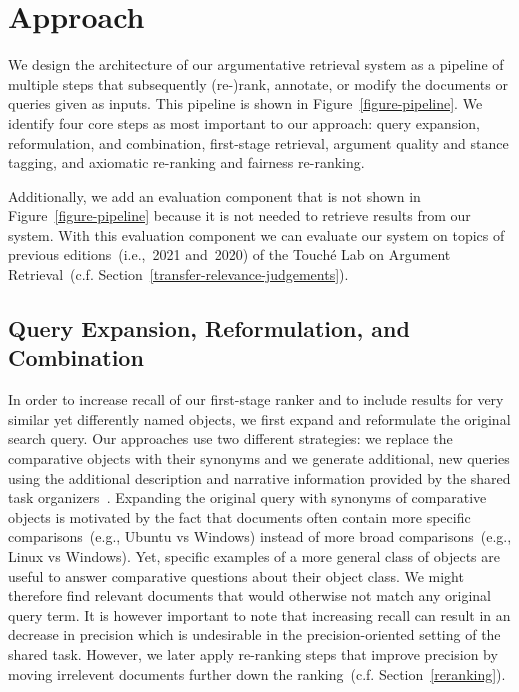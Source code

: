 \section{Approach}\label{approach}



We design the architecture of our argumentative retrieval system as a pipeline of multiple steps that subsequently (re-)rank, annotate, or modify the documents or queries given as inputs. This pipeline is shown in Figure~\ref{figure-pipeline}.
We identify four core steps as most important to our approach:
\Ni query expansion, reformulation, and combination,
\Nii first-stage retrieval,
\Niii argument quality and stance tagging,
and \Niv axiomatic re-ranking and fairness re-ranking.

Additionally, we add an evaluation component that is not shown in Figure~\ref{figure-pipeline} because it is not needed to retrieve results from our system.
With this evaluation component we can evaluate our system on topics of previous editions~(i.e.,~2021 and~2020) of the Touché Lab on Argument Retrieval~(c.f. Section~\ref{transfer-relevance-judgements}).

\subsection{Query Expansion, Reformulation, and Combination}
\label{reformulation}

In order to increase recall of our first-stage ranker and to include results for very similar yet differently named objects, we first expand and reformulate the original search query.
Our approaches use two different strategies: \Ni we replace the comparative objects with their synonyms and \Nii we generate additional, new queries using the additional description and narrative information provided by the shared task organizers~\cite{BondarenkoFKSGBPBSWPH2022}.
Expanding the original query with synonyms of comparative objects is motivated by the fact that documents often contain more specific comparisons~(e.g., Ubuntu vs Windows) instead of more broad comparisons~(e.g., Linux vs Windows).
Yet, specific examples of a more general class of objects are useful to answer comparative questions about their object class.
We might therefore find relevant documents that would otherwise not match any original query term.
It is however important to note that increasing recall can result in an decrease in precision which is undesirable in the precision-oriented setting of the shared task.
However, we later apply re-ranking steps that improve precision by moving irrelevent documents further down the ranking~(c.f. Section~\ref{reranking}).

